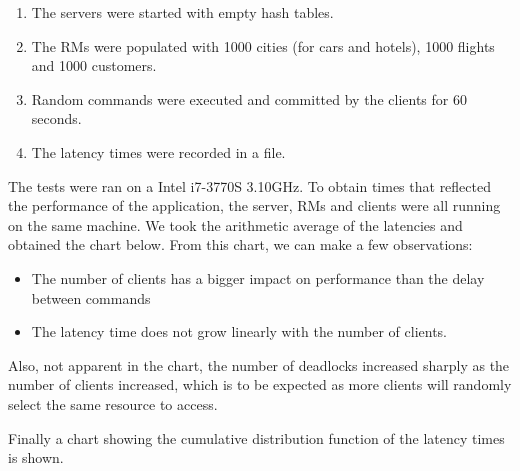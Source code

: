 \documentclass[11pt]{article}
\begin{document}
\begin{enumerate}
\item The servers were started with empty hash tables.
\item The RMs were populated with 1000 cities (for cars
  and hotels), 1000 flights and 1000 customers.
\item Random commands were executed and committed by the clients for
  60 seconds.
\item The latency times were recorded in a file.
\end{enumerate}

The tests were ran on a Intel i7-3770S 3.10GHz.  To obtain times that
reflected the performance of the application, the server, RMs and
clients were all running on the same machine.  We took the arithmetic
average of the latencies and obtained the chart below.  From this
chart, we can make a few observations:

\begin{itemize}
\item The number of clients has a bigger impact on performance than
  the delay between commands
\item The latency time does not grow linearly with the number of
  clients.
\end{itemize}

Also, not apparent in the chart, the number of deadlocks increased
sharply as the number of clients increased, which is to be expected as
more clients will randomly select the same resource to access.

Finally a chart showing the cumulative distribution function of the
latency times is shown.
\end{document}
